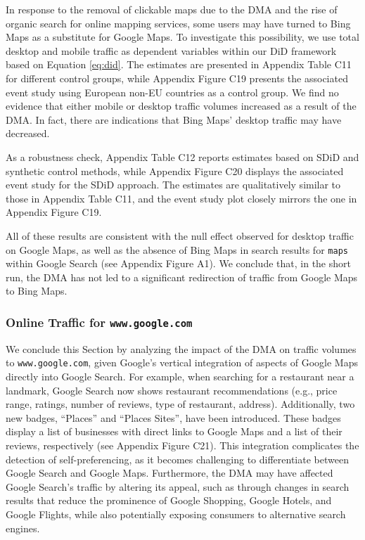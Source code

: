 \documentclass[11pt]{article}
\begin{document}
	In response to the removal of clickable maps due to the DMA and the rise of organic search for online mapping services, some users may have turned to Bing Maps as a substitute for Google Maps. To investigate this possibility, we use total desktop and mobile traffic as dependent variables within our DiD framework based on Equation \ref{eq:did}. The estimates are presented in Appendix Table C11 for different control groups, while Appendix Figure C19 presents the associated event study using European non-EU countries as a control group. We find no evidence that either mobile or desktop traffic volumes increased as a result of the DMA. In fact, there are indications that Bing Maps' desktop traffic may have decreased.
	
	
	As a robustness check, Appendix Table C12 reports estimates based on SDiD and synthetic control methods, while Appendix Figure C20 displays the associated event study for the SDiD approach. The estimates are qualitatively similar to those in Appendix Table C11, and the event study plot closely mirrors the one in Appendix Figure C19.
	
	
	All of these results are consistent with the null effect observed for desktop traffic on Google Maps, as well as the absence of Bing Maps in search results for \texttt{maps} within Google Search (see Appendix Figure A1). We conclude that, in the short run, the DMA has not led to a significant redirection of traffic from Google Maps to Bing Maps.
	
	
	
	\subsubsection{Online Traffic for \texttt{www.google.com}} \label{subsec: google}
	
	We conclude this Section by analyzing the impact of the DMA on traffic volumes to \texttt{www.google.com}, given Google’s vertical integration of aspects of Google Maps directly into Google Search. For example, when searching for a restaurant near a landmark, Google Search now shows restaurant recommendations (e.g., price range, ratings, number of reviews, type of restaurant, address). Additionally, two new badges, ``Places'' and ``Places Sites'', have been introduced. These badges display a list of businesses with direct links to Google Maps and a list of their reviews, respectively (see Appendix Figure C21). This integration complicates the detection of self-preferencing, as it becomes challenging to differentiate between Google Search and Google Maps. Furthermore, the DMA may have affected Google Search’s traffic by altering its appeal, such as through changes in search results that reduce the prominence of Google Shopping, Google Hotels, and Google Flights, while also potentially exposing consumers to alternative search engines.
	
\end{document}
